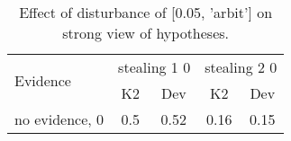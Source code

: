 \begin{table}\begin{tabular}{l|cc|cc}\toprule\multirow{2}{*}{Evidence} & \multicolumn{2}{c}{stealing 1 0}& \multicolumn{2}{c}{stealing 2 0}\\& {K2} & {Dev}& {K2} & {Dev}\\\midrule
no evidence, 0 & 0.5&0.52&0.16&0.15\\\bottomrule\end{tabular}\caption{Effect of disturbance of [0.05, 'arbit'] on strong view of hypotheses.}\end{table}